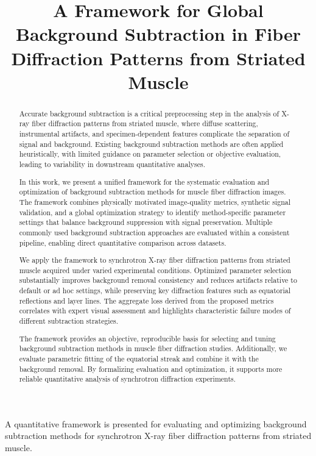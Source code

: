 \documentclass[iucr]{iucrjournals}
\title{A Framework for Global Background Subtraction in Fiber Diffraction Patterns from Striated Muscle}
\author{}
\date{}
\begin{document}
\maketitle

\begin{synopsis}
A quantitative framework is presented for evaluating and optimizing background subtraction methods for synchrotron X-ray fiber diffraction patterns from striated muscle.
\end{synopsis}


\begin{abstract}

Accurate background subtraction is a critical preprocessing step in the analysis of X-ray fiber diffraction patterns from striated muscle, where diffuse scattering, instrumental artifacts, and specimen-dependent features complicate the separation of signal and background. Existing background subtraction methods are often applied heuristically, with limited guidance on parameter selection or objective evaluation, leading to variability in downstream quantitative analyses.

In this work, we present a unified framework for the systematic evaluation and optimization of background subtraction methods for muscle fiber diffraction images. The framework combines physically motivated image-quality metrics, synthetic signal validation, and a global optimization strategy to identify method-specific parameter settings that balance background suppression with signal preservation. Multiple commonly used background subtraction approaches are evaluated within a consistent pipeline, enabling direct quantitative comparison across datasets.

We apply the framework to synchrotron X-ray fiber diffraction patterns from striated muscle acquired under varied experimental conditions. Optimized parameter selection substantially improves background removal consistency and reduces artifacts relative to default or ad hoc settings, while preserving key diffraction features such as equatorial reflections and layer lines. The aggregate loss derived from the proposed metrics correlates with expert visual assessment and highlights characteristic failure modes of different subtraction strategies.

The framework provides an objective, reproducible basis for selecting and tuning background subtraction methods in muscle fiber diffraction studies. Additionally, we evaluate parametric fitting of the equatorial streak and combine it with the background removal. By formalizing evaluation and optimization, it supports more reliable quantitative analysis of synchrotron diffraction experiments.


\end{abstract}
\end{document}
